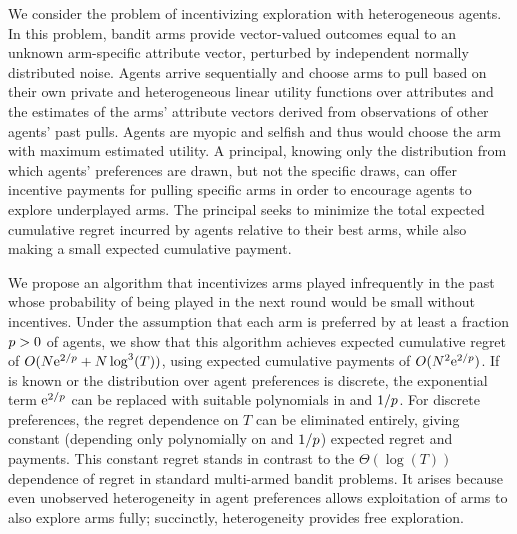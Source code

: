 We consider the problem of incentivizing exploration with heterogeneous agents.
In this problem, bandit arms provide vector-valued outcomes equal to an unknown
arm-specific attribute vector,
perturbed by independent normally distributed noise.
Agents arrive sequentially and choose arms to pull based on their own
private and heterogeneous linear utility functions over attributes
and the estimates of the arms' attribute vectors derived from
observations of other agents' past pulls.
Agents are myopic and selfish and thus would choose the arm with
maximum estimated utility.
A principal, knowing only the distribution from which agents'
preferences are drawn, but not the specific draws,
can offer incentive payments for pulling specific arms
in order to encourage agents to explore underplayed arms.
The principal seeks to minimize the total expected cumulative regret
incurred by agents relative to their best arms,
while also making a small expected cumulative payment.

We propose an algorithm that incentivizes arms played infrequently in the
past whose probability of being played in the next round would be small
without incentives.
Under the assumption that each arm is preferred by at
least a fraction $p > 0$ of agents,
we show that this algorithm achieves expected
cumulative regret of $O (N \mathrm{e}^{2/p} + N \log^3(T))$,
using expected cumulative payments of $O(N^2 \mathrm{e}^{2/p})$.
If \MinProb is known or the distribution over agent
preferences is discrete,
the exponential term $\mathrm{e}^{2/p}$ can be replaced with suitable
polynomials in \ARMNUM and $1/p$.
For discrete preferences, the regret dependence on $T$ can be
eliminated entirely, giving constant (depending only polynomially on
\ARMNUM and $1/p$) expected regret and payments.
This constant regret stands in contrast to the $\Theta(\log(T))$ dependence of
regret in standard multi-armed bandit problems.
It arises because even unobserved heterogeneity in agent preferences
allows exploitation of arms to also explore arms fully;
succinctly, heterogeneity provides free exploration.
